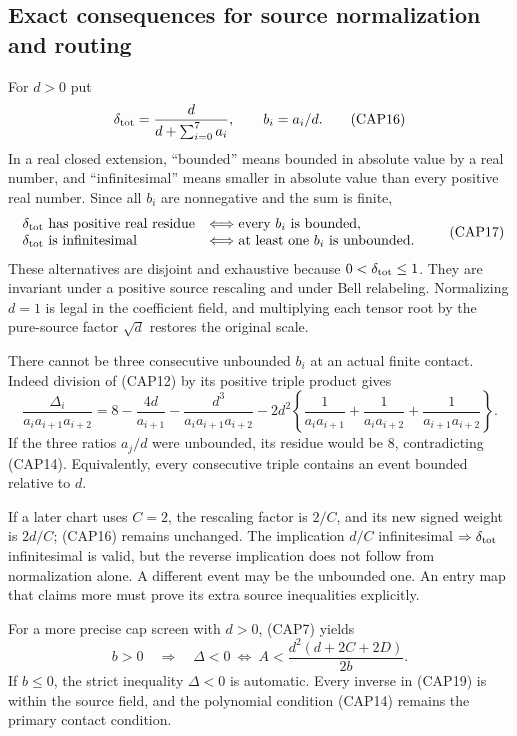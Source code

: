 \subsection{Exact consequences for source normalization and routing}

For $d>0$ put
\[
\delta_{\rm tot}=\frac{d}{d+\sum_{i=0}^7a_i},
\qquad b_i=a_i/d.
\tag{CAP16}
\]
In a real closed extension, ``bounded'' means bounded in absolute
value by a real number, and ``infinitesimal'' means smaller in
absolute value than every positive real number.  Since all $b_i$
are nonnegative and the sum is finite,
\[
\begin{array}{ll}
\delta_{\rm tot}\text{ has positive real residue}
 &\Longleftrightarrow\text{every }b_i\text{ is bounded},\\
\delta_{\rm tot}\text{ is infinitesimal}
 &\Longleftrightarrow\text{at least one }b_i\text{ is unbounded}.
\end{array}
\tag{CAP17}
\]
These alternatives are disjoint and exhaustive because
$0<\delta_{\rm tot}\leq1$.  They are invariant under a positive
source rescaling and under Bell relabeling.  Normalizing $d=1$ is
legal in the coefficient field, and multiplying each tensor root by
the pure-source factor $\sqrt d$ restores the original scale.

There cannot be three consecutive unbounded $b_i$ at an actual finite
contact.  Indeed division of (CAP12) by its positive triple product
gives
\[
\frac{\Delta_i}{a_i a_{i+1}a_{i+2}}
 =8-\frac{4d}{a_{i+1}}
 -\frac{d^3}{a_i a_{i+1}a_{i+2}}
 -2d^2\left\{
 \frac1{a_i a_{i+1}}+\frac1{a_i a_{i+2}}
 +\frac1{a_{i+1}a_{i+2}}\right\}.
\tag{CAP18}
\]
If the three ratios $a_j/d$ were unbounded, its residue would be
$8$, contradicting (CAP14).  Equivalently, every consecutive triple
contains an event bounded relative to $d$.

If a later chart uses $C=2$, the rescaling factor is $2/C$, and its
new signed weight is $2d/C$; (CAP16) remains unchanged.  The implication
$d/C$ infinitesimal $\Rightarrow\delta_{\rm tot}$ infinitesimal is
valid, but the reverse implication does not follow from normalization
alone.  A different event may be the unbounded one.  An entry map that
claims more must prove its extra source inequalities explicitly.

For a more precise cap screen with $d>0$, (CAP7) yields
\[
b>0\quad\Longrightarrow\quad
\Delta<0\ \Longleftrightarrow\
A<\frac{d^2(d+2C+2D)}{2b}.
\tag{CAP19}
\]
If $b\leq0$, the strict inequality $\Delta<0$ is automatic.  Every
inverse in (CAP19) is within the source field, and the polynomial
condition (CAP14) remains the primary contact condition.


